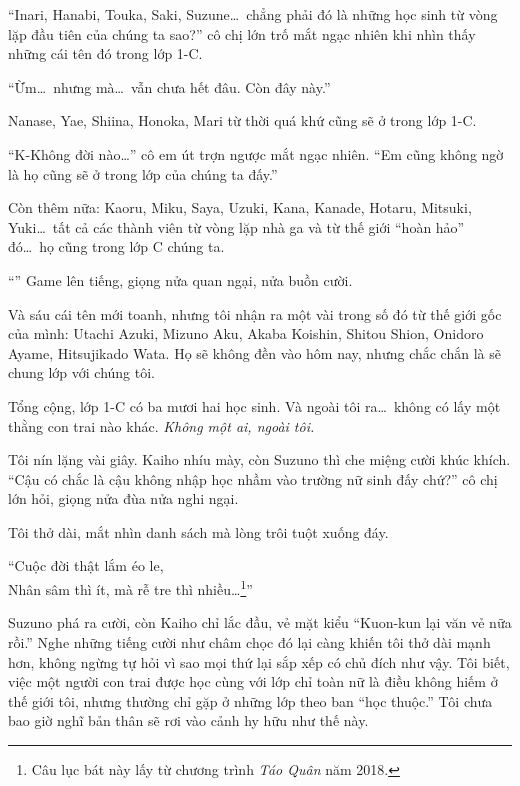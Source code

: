 \documentclass[../main.tex]{subfiles}
\begin{document}
``Inari, Hanabi, Touka, Saki, Suzune\dots\ chẳng phải đó là những học sinh từ vòng lặp đầu tiên của chúng ta sao?'' cô chị lớn trố mắt ngạc nhiên khi nhìn thấy những cái tên đó trong lớp 1-C.

``Ừm\dots\ nhưng mà\dots\ vẫn chưa hết đâu. Còn đây này.''

Nanase, Yae, Shiina, Honoka, Mari từ thời quá khứ cũng sẽ ở trong lớp 1-C.

``K-Không đời nào\dots'' cô em út trợn ngược mắt ngạc nhiên. ``Em cũng không ngờ là họ cũng sẽ ở trong lớp của chúng ta đấy.''

Còn thêm nữa: Kaoru, Miku, Saya, Uzuki, Kana, Kanade, Hotaru, Mitsuki, Yuki\dots\ tất cả các thành viên từ vòng lặp nhà ga và từ thế giới ``hoàn hảo'' đó\dots\ họ cũng trong lớp C chúng ta.

``'' Game lên tiếng, giọng nửa quan ngại, nửa buồn cười.

Và sáu cái tên mới toanh, nhưng tôi nhận ra một vài trong số đó từ thế giới gốc của mình: Utachi Azuki, Mizuno Aku, Akaba Koishin, Shitou Shion, Onidoro Ayame, Hitsujikado Wata. Họ sẽ không đền vào hôm nay, nhưng chắc chắn là sẽ chung lớp với chúng tôi.

Tổng cộng, lớp 1-C có ba mươi hai học sinh. Và ngoài tôi ra\dots\ không có lấy một thằng con trai nào khác. \emph{Không một ai, ngoài tôi.}

Tôi nín lặng vài giây. Kaiho nhíu mày, còn Suzuno thì che miệng cười khúc khích. ``Cậu có chắc là cậu không nhập học nhầm vào trường nữ sinh đấy chứ?'' cô chị lớn hỏi, giọng nửa đùa nửa nghi ngại.

Tôi thở dài, mắt nhìn danh sách mà lòng trôi tuột xuống đáy.

\begin{center}
  ``Cuộc đời thật lắm éo le,\\
  Nhân sâm thì ít, mà rễ tre thì nhiều\dots\footnote{Câu lục bát này lấy từ chương trình \textit{Táo Quân} năm 2018.}''
\end{center}

Suzuno phá ra cười, còn Kaiho chỉ lắc đầu, vẻ mặt kiểu ``Kuon-kun lại văn vẻ nữa rồi.'' Nghe những tiếng cười như châm chọc đó lại càng khiến tôi thở dài mạnh hơn, không ngừng tự hỏi vì sao mọi thứ lại sắp xếp có chủ đích như vậy. Tôi biết, việc một người con trai được học cùng với lớp chỉ toàn nữ là điều không hiếm ở thế giới tôi, nhưng thường chỉ gặp ở những lớp theo ban ``học thuộc.'' Tôi chưa bao giờ nghĩ bản thân sẽ rơi vào cảnh hy hữu như thế này.
\end{document}
